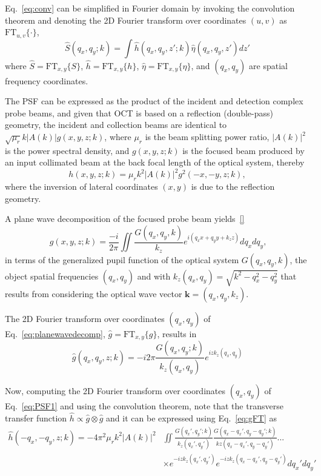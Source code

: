 \iffalse Eq.~\ref{eq:conv} can be simplified in Fourier domain by invoking the convolution theorem and denoting the 2D Fourier transform over coordinates $(u, v)$ as $\text{FT}_{u,v}\{\cdot\}$,
\begin{equation}\label{eq:convFT}
    \hat{S}(q_x, q_y; k) = \int \hat{h}(q_x, q_y, z'; k) \hat{\eta}(q_x, q_y, z') dz'
\end{equation}
where $\hat{S} = \text{FT}_{x,y}\{S\}$, $\hat{h} = \text{FT}_{x,y}\{h\}$, $\hat{\eta} = \text{FT}_{x,y}\{\eta\}$, and $(q_x,q_y)$ are spatial frequency coordinates.

The PSF can be expressed as the product of the incident and detection complex probe beams, and given that OCT is based on a reflection (double-pass) geometry, the incident and collection beams are identical to $\sqrt{\mu_r}k|A(k)|g(x,y,z;k)$, where $\mu_r$ is the beam splitting power ratio, $|A(k)|^2$ is the power spectral density, and $g(x,y,z; k)$ is the focused beam produced by an input collimated beam at the back focal length of the optical system, thereby
\begin{equation}\label{eq:PSF1}
    h(x,y,z; k) = \mu_rk^2|A(k)|^2g^2(-x, -y, z; k),
\end{equation}
where the inversion of lateral coordinates $(x,y)$ is due to the reflection geometry. 

A plane wave decomposition of the focused probe beam yields~\ref{}
\begin{equation}~\label{eq:planewavedecomp}
    g(x,y,z ;k) = \frac{-i}{2\pi}\iint \frac{G(q_x, q_y, k)}{k_z}e^{i(q_xx+q_yy+k_zz)} dq_xdq_y,
\end{equation}
in terms of the generalized pupil function of the optical system $G(q_x, q_y, k)$, the object spatial frequencies $(q_x, q_y)$ and with $k_z(q_x, q_y) = \sqrt{k^2 - q_x^2 - q_y^2}$ that results from considering the optical wave vector $\mathbf{k}=(q_x, q_y, k_z)$.

The 2D Fourier transform over coordinates $(q_x, q_y)$ of Eq.~\ref{eq:planewavedecomp}, $\hat{g} =  \text{FT}_{x,y}\{g\}$, results in
\begin{equation}\label{eq:gFT}
    \hat{g}(q_x, q_y, z; k) = -i2\pi\frac{G(q_x, q_y; k)}{k_z(q_x, q_y)}e^{izk_z(q_x, q_y)}
\end{equation}

Now, computing the 2D Fourier transform over coordinates $(q_x, q_y)$ of Eq.~\ref{eq:PSF1} and using the convolution theorem, note that the transverse transfer function $\hat{h} \propto \hat{g} \otimes\hat{g}$ and it can be expressed using Eq.~\ref{eq:gFT} as
\begin{align}\label{eq:hFT}
    \hat{h}(-q_x, -q_y, z; k) = -4\pi^2\mu_rk^2|A(k)|^2  &\iint \frac{G(q_x', q_y'; k)}{k_z(q_x', q_y')} \frac{G(q_x-q_x', q_y-q_y'; k)}{kz(q_x-q_x', q_y-q_y')}... \nonumber\\
    &\times e^{-izk_z(q_x', q_y')}e^{-izk_z(q_x-q_x', q_y-q_y')}dq_x'dq_y'
\end{align}

